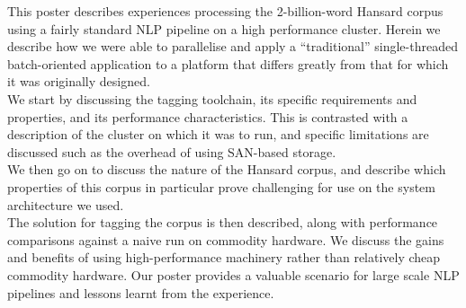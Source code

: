     This poster describes experiences processing the 2-billion-word Hansard corpus using a fairly standard NLP pipeline on a high performance cluster.  Herein we describe how we were able to parallelise and apply a ``traditional'' single-threaded batch-oriented application to a platform that differs greatly from that for which it was originally designed.\\
    We start by discussing the tagging toolchain, its specific requirements and properties, and its performance characteristics.  This is contrasted with a description of the cluster on which it was to run, and specific limitations are discussed such as the overhead of using SAN-based storage.\\
    We then go on to discuss the nature of the Hansard corpus, and describe which properties of this corpus in particular prove challenging for use on the system architecture we used.\\
    The solution for tagging the corpus is then described, along with performance comparisons against a naive run on commodity hardware.  We discuss the gains and benefits of using high-performance machinery rather than relatively cheap commodity hardware. Our poster provides a valuable scenario for large scale NLP pipelines and lessons learnt from the experience.


%
% 



